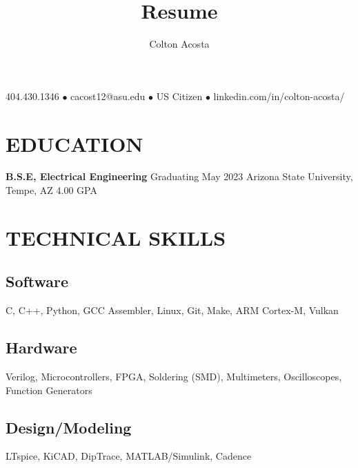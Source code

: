 \documentclass{article}
\makeatletter
\renewcommand{\maketitle}{
	\begin{center}
		{\huge\bfseries
			\theauthor}
			
		404.430.1346 $\bullet$ cacost12@asu.edu $\bullet$ US Citizen $\bullet$ linkedin.com/in/colton-acosta/
	\end{center}
}
\makeatother
\begin{document}
\title{Resume}
\author{Colton Acosta}
\maketitle
\section{EDUCATION}
\textbf{B.S.E, Electrical Engineering}
\hfill 
Graduating May 2023
\linebreak
Arizona State University, Tempe, AZ 
\hfill
4.00 GPA

\section{TECHNICAL SKILLS}
\subsection{Software} 
C, C++, Python, GCC Assembler, Linux, Git, Make, ARM Cortex-M, Vulkan
\subsection{Hardware}
Verilog, Microcontrollers, FPGA, Soldering (SMD), Multimeters, Oscilloscopes, Function Generators 
\subsection{Design/Modeling}
LTspice, KiCAD, DipTrace, MATLAB/Simulink, Cadence 
\end{document}
